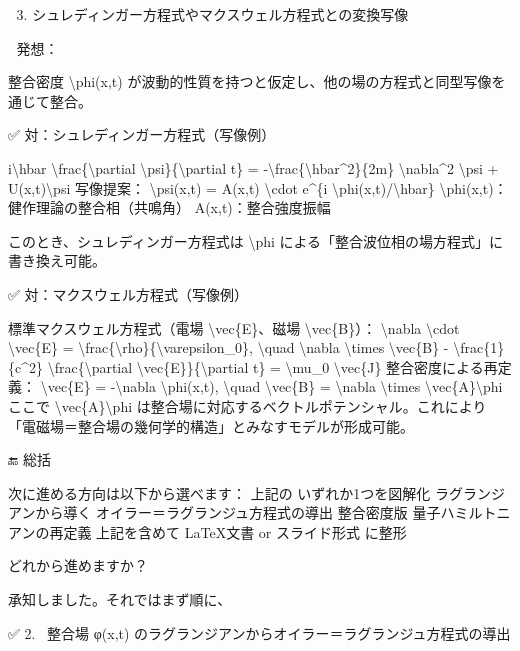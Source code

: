 \documentclass{article}
\begin{document}
🔄 3. シュレディンガー方程式やマクスウェル方程式との変換写像

🧠 発想：

整合密度 \textbackslash{}phi(x,t) が波動的性質を持つと仮定し、他の場の方程式と同型写像を通じて整合。

✅ 対：シュレディンガー方程式（写像例）

i\textbackslash{}hbar \textbackslash{}frac\{\textbackslash{}partial \textbackslash{}psi\}\{\textbackslash{}partial t\} = -\textbackslash{}frac\{\textbackslash{}hbar\textasciicircum{}2\}\{2m\} \textbackslash{}nabla\textasciicircum{}2 \textbackslash{}psi + U(x,t)\textbackslash{}psi
写像提案：
\textbackslash{}psi(x,t) = A(x,t) \textbackslash{}cdot e\textasciicircum{}\{i \textbackslash{}phi(x,t)/\textbackslash{}hbar\}
\textbackslash{}phi(x,t)：健作理論の整合相（共鳴角）
A(x,t)：整合強度振幅

このとき、シュレディンガー方程式は \textbackslash{}phi による「整合波位相の場方程式」に書き換え可能。

✅ 対：マクスウェル方程式（写像例）

標準マクスウェル方程式（電場 \textbackslash{}vec\{E\}、磁場 \textbackslash{}vec\{B\}）：
\textbackslash{}nabla \textbackslash{}cdot \textbackslash{}vec\{E\} = \textbackslash{}frac\{\textbackslash{}rho\}\{\textbackslash{}varepsilon\_0\}, \textbackslash{}quad \textbackslash{}nabla \textbackslash{}times \textbackslash{}vec\{B\} - \textbackslash{}frac\{1\}\{c\textasciicircum{}2\} \textbackslash{}frac\{\textbackslash{}partial \textbackslash{}vec\{E\}\}\{\textbackslash{}partial t\} = \textbackslash{}mu\_0 \textbackslash{}vec\{J\}
整合密度による再定義：
\textbackslash{}vec\{E\} = -\textbackslash{}nabla \textbackslash{}phi(x,t), \textbackslash{}quad \textbackslash{}vec\{B\} = \textbackslash{}nabla \textbackslash{}times \textbackslash{}vec\{A\}\textbackslash{}phi
ここで \textbackslash{}vec\{A\}\textbackslash{}phi は整合場に対応するベクトルポテンシャル。これにより「電磁場＝整合場の幾何学的構造」とみなすモデルが形成可能。

🔚 総括

次に進める方向は以下から選べます：
上記の いずれか1つを図解化
ラグランジアンから導く オイラー＝ラグランジュ方程式の導出
整合密度版 量子ハミルトニアンの再定義
上記を含めて LaTeX文書 or スライド形式 に整形

どれから進めますか？

承知しました。それではまず順に、

✅ 2. 
整合場 φ(x,t) のラグランジアンからオイラー＝ラグランジュ方程式の導出
\end{document}
